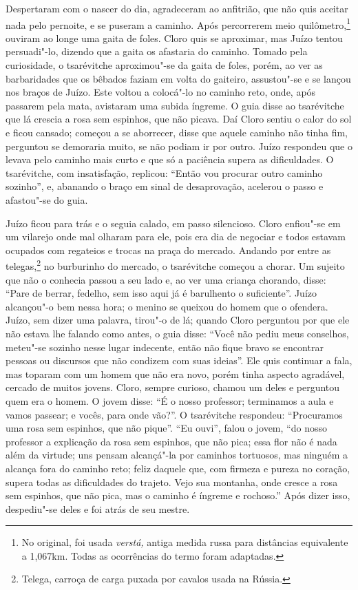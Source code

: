 Despertaram com o nascer do dia, agradeceram ao anfitrião, que não quis
aceitar nada pelo pernoite, e se puseram a caminho. Após percorrerem
meio quilômetro,\footnote{No original, foi usada \emph{verstá,} antiga
  medida russa para distâncias equivalente a 1,067km. Todas as
  ocorrências do termo foram adaptadas.} ouviram ao longe uma gaita de
foles. Cloro quis se aproximar, mas Juízo tentou persuadi"-lo, dizendo
que a gaita os afastaria do caminho. Tomado pela curiosidade, o
tsarévitche aproximou"-se da gaita de foles, porém, ao ver as
barbaridades que os bêbados faziam em volta do gaiteiro, assustou"-se e
se lançou nos braços de Juízo. Este voltou a colocá"-lo no caminho reto,
onde, após passarem pela mata, avistaram uma subida íngreme. O guia disse
ao tsarévitche que lá crescia a rosa sem espinhos, que não picava. Daí
Cloro sentiu o calor do sol e ficou cansado; começou a se aborrecer,
disse que aquele caminho não tinha fim, perguntou se demoraria muito, se
não podiam ir por outro. Juízo respondeu que o levava pelo caminho mais
curto e que só a paciência supera as dificuldades. O tsarévitche, com
insatisfação, replicou: ``Então vou procurar outro caminho sozinho'', e,
abanando o braço em sinal de desaprovação, acelerou o passo e afastou"-se
do guia.

Juízo ficou para trás e o seguia calado, em passo silencioso. Cloro
enfiou"-se em um vilarejo onde mal olharam para ele, pois era dia de
negociar e todos estavam ocupados com regateios e trocas na praça do
mercado. Andando por entre as telegas,\footnote{Telega, carroça de carga puxada por cavalos usada na Rússia.} no burburinho do mercado, o
tsarévitche começou a chorar. Um sujeito que não o conhecia passou a seu
lado e, ao ver uma criança chorando, disse: ``Pare de berrar, fedelho,
sem isso aqui já é barulhento o suficiente''. Juízo alcançou"-o bem nessa
hora; o menino se queixou do homem que o ofendera. Juízo, sem dizer uma
palavra, tirou"-o de lá; quando Cloro perguntou por que ele não estava
lhe falando como antes, o guia disse: ``Você não pediu meus conselhos,
meteu"-se sozinho nesse lugar indecente, então não fique bravo se
encontrar pessoas ou discursos que não condizem com suas ideias''. Ele
quis continuar a fala, mas toparam com um homem que não era novo, porém
tinha aspecto agradável, cercado de muitos jovens. Cloro, sempre
curioso, chamou um deles e perguntou quem era o homem. O jovem disse:
``É o nosso professor; terminamos a aula e vamos passear; e vocês, para
onde vão?''. O tsarévitche respondeu: ``Procuramos uma rosa sem
espinhos, que não pique''. ``Eu ouvi'', falou o jovem, ``do nosso
professor a explicação da rosa sem espinhos, que não pica; essa flor não
é nada além da virtude; uns pensam alcançá"-la por caminhos tortuosos,
mas ninguém a alcança fora do caminho reto; feliz daquele que, com
firmeza e pureza no coração, supera todas as dificuldades do trajeto.
Vejo sua montanha, onde cresce a rosa sem espinhos, que não pica, mas o
caminho é íngreme e rochoso.'' Após dizer isso, despediu"-se deles e foi
atrás de seu mestre.

